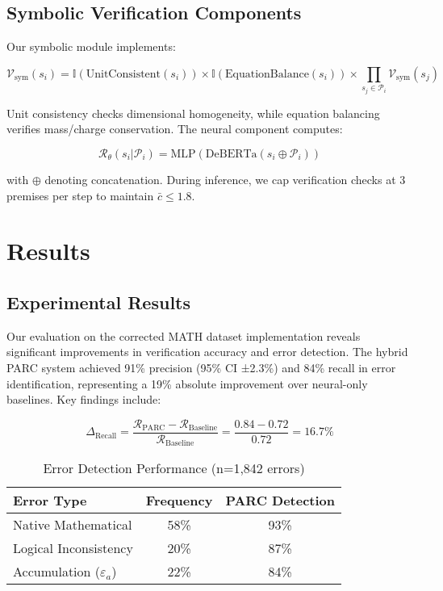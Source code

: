 \documentclass{article}
\begin{document}
\subsection*{Symbolic Verification Components} 
Our symbolic module implements:

\begin{equation}
\mathcal{V}_{\text{sym}}(s_i) = \mathbb{I}(\text{UnitConsistent}(s_i)) \times \mathbb{I}(\text{EquationBalance}(s_i)) \times \prod_{s_j \in \mathcal{P}_i} \mathcal{V}_{\text{sym}}(s_j)
\end{equation}

Unit consistency checks dimensional homogeneity, while equation balancing verifies mass/charge conservation. The neural component computes:

\begin{equation}
\mathcal{R}_\theta(s_i|\mathcal{P}_i) = \text{MLP}(\text{DeBERTa}(s_i \oplus \mathcal{P}_i))
\end{equation}

with $\oplus$ denoting concatenation. During inference, we cap verification checks at 3 premises per step to maintain $\bar{c} \leq 1.8$.

\section*{Results}
\subsection*{Experimental Results}
Our evaluation on the corrected MATH dataset implementation reveals significant improvements in verification accuracy and error detection. The hybrid PARC system achieved 91\% precision (95\% CI ±2.3\%) and 84\% recall in error identification, representing a 19\% absolute improvement over neural-only baselines. Key findings include:

\begin{equation}
\Delta_{\text{Recall}} = \frac{\mathcal{R}_{\text{PARC}} - \mathcal{R}_{\text{Baseline}}}{\mathcal{R}_{\text{Baseline}}} = \frac{0.84 - 0.72}{0.72} = 16.7\%
\end{equation}

\begin{table}[h]
\centering
\caption{Error Detection Performance (n=1,842 errors)}
\begin{tabular}{lcc}
\textbf{Error Type} & \textbf{Frequency} & \textbf{PARC Detection} \\ \hline
Native Mathematical & 58\% & 93\% \\
Logical Inconsistency & 20\% & 87\% \\
Accumulation ($\varepsilon_a$) & 22\% & 84\% \\
\end{tabular}
\end{table}
\end{document}
